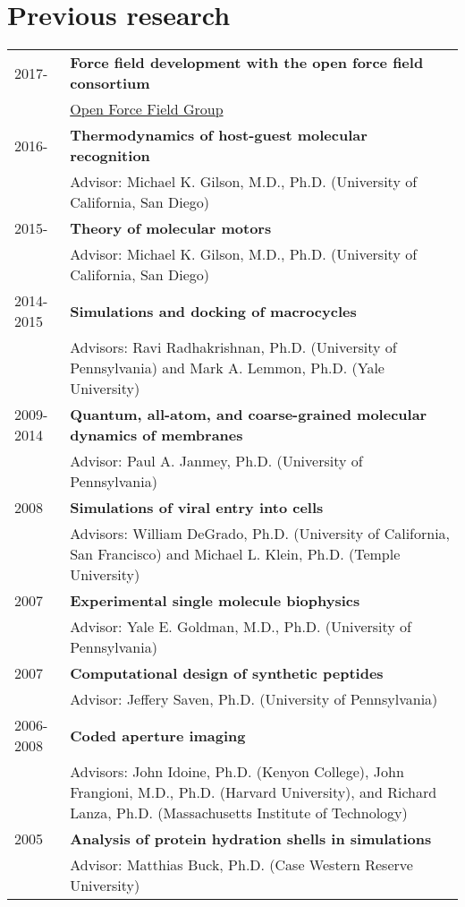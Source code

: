 \documentclass[letterpaper,11pt]{article}
\begin{document}
\nopagebreak[4]
\section{Previous research}
\begin{longtable}[H]{lp{16cm}}
2017- & \bf{Force field development with the open force field consortium} \\
      & \href{http://www.openforcefield.org}{Open Force Field Group} \\
2016- & \bf{Thermodynamics of host-guest molecular recognition} \\
      & Advisor: Michael K. Gilson, M.D., Ph.D. (University of California, San Diego)\\
2015- & \bf{Theory of molecular motors} \\
      & Advisor: Michael K. Gilson, M.D., Ph.D. (University of California, San Diego)\\
2014-2015 & \bf{Simulations and docking of macrocycles} \\
     & Advisors: Ravi Radhakrishnan, Ph.D. (University of Pennsylvania) and Mark A. Lemmon, Ph.D. (Yale University) \\
2009-2014 & \bf{Quantum, all-atom, and coarse-grained molecular dynamics of membranes} \\
     & Advisor: Paul A. Janmey, Ph.D. (University of Pennsylvania) \\
2008 & \bf{Simulations of viral entry into cells} \\
     & Advisors: William DeGrado, Ph.D. (University of California, San Francisco) and Michael L. Klein, Ph.D. (Temple University) \\
2007 & \bf{Experimental single molecule biophysics} \\
     & Advisor: Yale E. Goldman, M.D., Ph.D. (University of Pennsylvania) \\
2007 & \bf{Computational design of synthetic peptides} \\
     & Advisor: Jeffery Saven, Ph.D. (University of Pennsylvania) \\
2006-2008 & \bf{Coded aperture imaging} \\
     & Advisors: John Idoine, Ph.D. (Kenyon College), John Frangioni, M.D., Ph.D. (Harvard University), and Richard Lanza, Ph.D. (Massachusetts Institute of Technology) \\
2005 & \bf{Analysis of protein hydration shells in simulations} \\
     & Advisor: Matthias Buck, Ph.D. (Case Western Reserve University) \\
\end{longtable}
\end{document}

